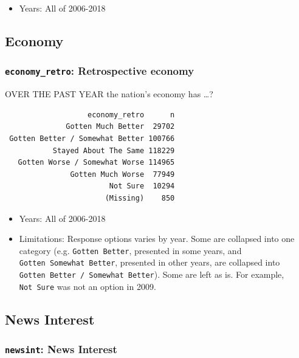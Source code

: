 \documentclass[10pt,article,oneside]{memoir}
\theoremstyle{definition}
\begin{document}
\begin{itemize}
\tightlist
\item
  Years: All of 2006-2018
\end{itemize}

\subsection{Economy}\label{economy}

\subsubsection{\texorpdfstring{\texttt{economy\_retro}: Retrospective
economy}{economy\_retro: Retrospective economy}}\label{economy_retro-retrospective-economy}

OVER THE PAST YEAR the nation's economy has \ldots{}?

\begin{verbatim}
                   economy_retro      n
              Gotten Much Better  29702
 Gotten Better / Somewhat Better 100766
           Stayed About The Same 118229
   Gotten Worse / Somewhat Worse 114965
               Gotten Much Worse  77949
                        Not Sure  10294
                       (Missing)    850
\end{verbatim}

\begin{itemize}
\tightlist
\item
  Years: All of 2006-2018
\item
  Limitations: Response options varies by year. Some are collapsed into
  one category (e.g. \texttt{Gotten\ Better}, presented in some years,
  and \texttt{Gotten\ Somewhat\ Better}, presented in other years, are
  collapsed into \texttt{Gotten\ Better\ /\ Somewhat\ Better}). Some are
  left as is. For example, \texttt{Not\ Sure} was not an option in 2009.
\end{itemize}

\subsection{News Interest}\label{news-interest}

\subsubsection{\texorpdfstring{\texttt{newsint}: News
Interest}{newsint: News Interest}}\label{newsint-news-interest}
\end{document}
